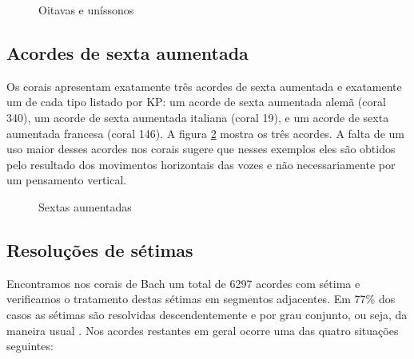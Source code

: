 \begin{figure}[!h]
  \centering
  \qquad
  \qquad
  \caption{Oitavas e uníssonos}
  \label{fig:oitavas-e-unissonos}
\end{figure}

\subsection{Acordes de sexta aumentada}
\label{sec:acordes-de-sexta}

Os corais apresentam exatamente três acordes de sexta aumentada e
exatamente um de cada tipo listado por KP: um acorde de sexta
aumentada alemã (coral 340), um acorde de sexta aumentada italiana
(coral 19), e um acorde de sexta aumentada francesa (coral 146). A
figura \ref{fig:sextas-aumentadas} mostra os três acordes. A falta de
um uso maior desses acordes nos corais sugere que nesses exemplos eles
são obtidos pelo resultado dos movimentos horizontais das vozes e não
necessariamente por um pensamento vertical.

\begin{figure}[!h]
  \centering
  \caption{Sextas aumentadas}
  \label{fig:sextas-aumentadas}
\end{figure}

\subsection{Resoluções de sétimas}
\label{sec:setimas}

Encontramos nos corais de Bach um total de 6297 acordes com sétima e
verificamos o tratamento destas sétimas em segmentos adjacentes. Em
77\% dos casos as sétimas são resolvidas descendentemente e por grau
conjunto, ou seja, da maneira usual \cite[p. 207]{kostka.ea00:tonal}.
Nos acordes restantes em geral ocorre uma das quatro situações
seguintes:

